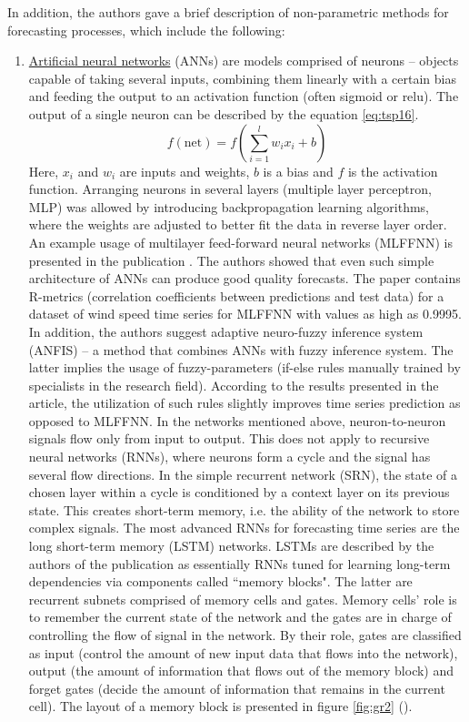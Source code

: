 \documentclass[13pt, a4paper]{article}
\begin{document}
In addition, the authors gave a brief description of non-parametric methods for forecasting processes, which include the following:
\begin{enumerate}
	\item \underline{Artificial neural networks} (ANNs) are models comprised of neurons -- objects capable of taking several inputs, combining them linearly with a certain bias and feeding the output to an activation function (often sigmoid or relu). The output of a single neuron can be described by the equation \ref{eq:tsp16}.
\begin{equation} \label{eq:tsp16}
f(\mathrm{net}) = f\left( \sum_{i=1}^l w_i x_i + b \right)
\end{equation}
Here, $x_i$ and $w_i$ are inputs and weights, $b$ is a bias and $f$ is the activation function. Arranging neurons in several layers (multiple layer perceptron, MLP) was allowed by introducing backpropagation learning algorithms, where the weights are adjusted to better fit the data in reverse layer order.
An example usage of multilayer feed-forward neural networks (MLFFNN) is presented in the publication \cite{khosravi2018time}. The authors showed that even such simple architecture of ANNs can produce good quality forecasts. The paper contains R-metrics (correlation coefficients between predictions and test data) for a dataset of wind speed time series for MLFFNN with values as high as 0.9995.
In addition, the authors suggest adaptive neuro-fuzzy inference system (ANFIS) -- a method that combines ANNs with fuzzy inference system. The latter implies the usage of fuzzy-parameters (if-else rules manually trained by specialists in the research field). According to the results presented in the article, the utilization of such rules slightly improves time series prediction as opposed to MLFFNN.
In the networks mentioned above, neuron-to-neuron signals flow only from input to output. This does not apply to recursive neural networks (RNNs), where neurons form a cycle and the signal has several flow directions. In the simple recurrent network (SRN), the state of a chosen layer within a cycle is conditioned by a context layer on its previous state. This creates short-term memory, i.e. the ability of the network to store complex signals.
The most advanced RNNs for forecasting time series are the long short-term memory (LSTM) networks. LSTMs are described by the authors of the publication \cite{hua2019deep} as essentially RNNs tuned for learning long-term dependencies via components called ``memory blocks". The latter are recurrent subnets comprised of memory cells and gates. Memory cells' role is to remember the current state of the network and the gates are in charge of controlling the flow of signal in the network. By their role, gates are classified as input (control the amount of new input data that flows into the network), output (the amount of information that flows out of the memory block) and forget gates (decide the amount of information that remains in the current cell). The layout of a memory block is presented in figure \ref{fig:gr2} (\cite{hua2019deep}).

\end{enumerate}
\end{document}
